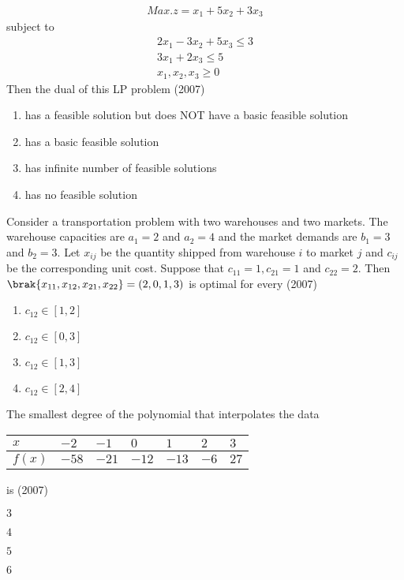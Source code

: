 		\begin{align*}
		Max. z=x_{1}+5 x_{2}+3 x_{3}
		\end{align*}
subject to
             \begin{align*}
 2 x_{1}-3 x_{2}+5 x_{3} \leq 3 \\
 3 x_{1}+2 x_{3} \leq 5 \\
 x_{1}, x_{2}, x_{3} \geq 0
             \end{align*}
	 Then the dual of this LP problem
	 \hfill{(2007)}
		\begin{enumerate}
			\item has a feasible solution but does NOT have a basic feasible solution
			\item has a basic feasible solution
			\item has infinite number of feasible solutions
			\item has no feasible solution
        	\end{enumerate}
	\item Consider a transportation problem with two warehouses and two markets. The warehouse capacities are $a_{1}=2$ and $a_{2}=4$ and the market demands are $b_{1}=3$ and $b_{2}=3$. Let $x_{i j}$ be the quantity shipped from warehouse $i$ to market $j$ and $c_{i j}$ be the corresponding unit cost. Suppose that $c_{11}=1, c_{21}=1$ and $c_{22}=2$. Then $\brak{x_{11}, x_{12}, x_{21}, x_{22}}=(2,0,1,3)$ is optimal for every
	\hfill{(2007)}
		\begin{enumerate}
			\item $c_{12} \in[1,2]$
			\item $c_{12} \in[0,3]$
	         	\item $c_{12} \in[1,3]$
                 	\item $c_{12} \in[2,4]$
	\end{enumerate}	
    \item The smallest degree of the polynomial that interpolates the data
     \begin{tabular}{|l|l|l|l|l|l|l|}
     \hline$x$ & $-2$ & $-1$ & $0$ & $1$ & $2$ & $3$ \\
     \hline$f(x)$ & $-58$ & $-21$ & $-12$ & $-13$ & $-6$ &$ 27$ \\
     \hline
\end{tabular}
is
\hfill{(2007)}
      \begin{enumerate}
	       \end{enumerate}
